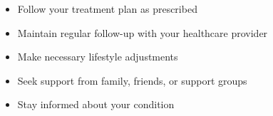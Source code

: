 \begin{itemize}[noitemsep]
  \item Follow your treatment plan as prescribed
  \item Maintain regular follow-up with your healthcare provider
  \item Make necessary lifestyle adjustments
  \item Seek support from family, friends, or support groups
  \item Stay informed about your condition
\end{itemize}
